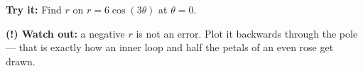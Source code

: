 \documentclass[12pt]{article}
\begin{document}
\begin{tryitbox}
\textbf{Try it:} \quad Find $r$ on $r = 6\cos(3\theta)$ at $\theta = 0$.\\[2pt]
\end{tryitbox}

\begin{watchoutbox}
\textbf{(!) Watch out:} a negative $r$ is not an error. Plot it backwards through the pole ---
that is exactly how an inner loop and half the petals of an even rose get drawn.
\end{watchoutbox}
\end{document}
